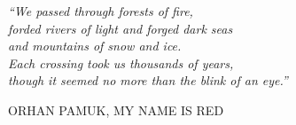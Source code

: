 \clearpage
\thispagestyle{empty}
\null
\vfill
\settowidth{}

{ \centering
\parbox{
\longest}{%
 \raggedright{\Large\itshape%
   “We passed through forests of fire, \\
   forded rivers of light and forged dark seas \\
   and mountains of snow and ice. \\
   Each crossing took us thousands of years, \\
   though it seemed no more than the blink of an eye.” 
 \par\bigskip
  }   
  \raggedleft\Large\MakeUppercase{ Orhan Pamuk, My Name is Red}\par%
}
\\}
\vfill
\clearpage